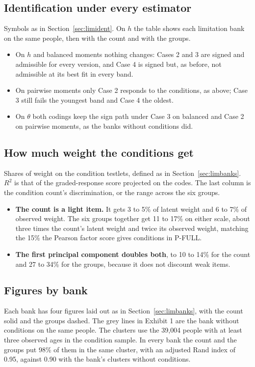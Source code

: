 \documentclass[11pt]{article}
\begin{document}
\subsection{Identification under every estimator}
Symbols as in Section~\ref{sec:limident}. On $h$ the table shows each
limitation bank on the same people, then with the count and with the groups.



\begin{itemize}\itemsep2pt
\item On $h$ and balanced moments nothing changes: Cases 2 and 3 are signed
and admissible for every version, and Case 4 is signed but, as before, not
admissible at its best fit in every band.
\item On pairwise moments only Case 2 responds to the conditions, as above;
Case 3 still fails the youngest band and Case 4 the oldest.
\item On $\theta$ both codings keep the sign path under Case 3 on balanced and
Case 2 on pairwise moments, as the banks without conditions did.
\end{itemize}

\subsection{How much weight the conditions get}
Shares of weight on the condition testlets, defined as in
Section~\ref{sec:limbanks}. $R^2$ is that of the graded-response score
projected on the codes. The last column is the condition count's
discrimination, or the range across the six groups.



\begin{itemize}\itemsep2pt
\item \textbf{The count is a light item.} It gets 3 to 5\% of latent weight and
6 to 7\% of observed weight. The six groups together get 11 to 17\% on either
scale, about three times the count's latent weight and twice its observed
weight, matching the 15\% the Pearson factor score gives conditions in P-FULL.
\item \textbf{The first principal component doubles both}, to 10 to 14\% for
the count and 27 to 34\% for the groups, because it does not discount weak
items.
\end{itemize}

\subsection{Figures by bank}
Each bank has four figures laid out as in Section~\ref{sec:limbanks}, with
the count solid and the groups dashed. The grey lines in Exhibit 1 are the
bank without conditions on the same people. The clusters use the 39{,}004
people with at least three observed ages in the condition sample. In every
bank the count and the groups put 98\% of them in the same cluster, with an
adjusted Rand index of 0.95, against 0.90 with the bank's clusters without
conditions.
\end{document}
